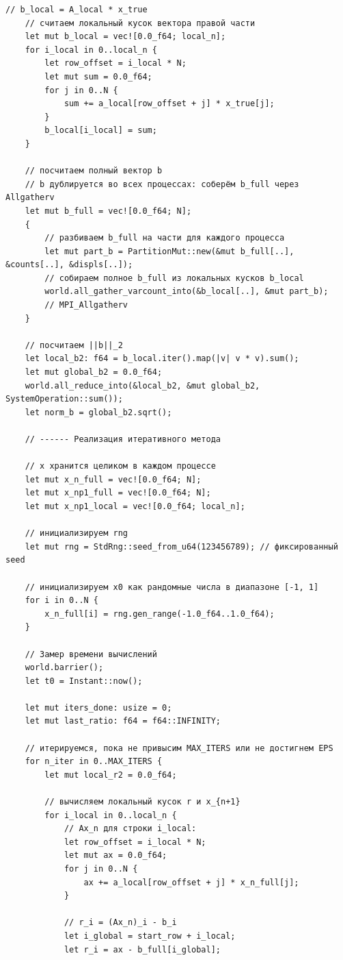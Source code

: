 \documentclass[a4paper, 14pt]{extarticle}
\begin{document}
\begin{lstlisting}[caption={Исходный код программы}, label={lst:source_code}]
    // b_local = A_local * x_true
    // считаем локальный кусок вектора правой части
    let mut b_local = vec![0.0_f64; local_n];
    for i_local in 0..local_n {
        let row_offset = i_local * N;
        let mut sum = 0.0_f64;
        for j in 0..N {
            sum += a_local[row_offset + j] * x_true[j];
        }
        b_local[i_local] = sum;
    }

    // посчитаем полный вектор b
    // b дублируется во всех процессах: соберём b_full через Allgatherv
    let mut b_full = vec![0.0_f64; N];
    {
        // разбиваем b_full на части для каждого процесса
        let mut part_b = PartitionMut::new(&mut b_full[..], &counts[..], &displs[..]);
        // собираем полное b_full из локальных кусков b_local
        world.all_gather_varcount_into(&b_local[..], &mut part_b);
        // MPI_Allgatherv
    }

    // посчитаем ||b||_2
    let local_b2: f64 = b_local.iter().map(|v| v * v).sum();
    let mut global_b2 = 0.0_f64;
    world.all_reduce_into(&local_b2, &mut global_b2, SystemOperation::sum());
    let norm_b = global_b2.sqrt();

    // ------ Реализация итеративного метода

    // x хранится целиком в каждом процессе
    let mut x_n_full = vec![0.0_f64; N];
    let mut x_np1_full = vec![0.0_f64; N];
    let mut x_np1_local = vec![0.0_f64; local_n];

    // инициализируем rng
    let mut rng = StdRng::seed_from_u64(123456789); // фиксированный seed

    // инициализируем x0 как рандомные числа в диапазоне [-1, 1]
    for i in 0..N {
        x_n_full[i] = rng.gen_range(-1.0_f64..1.0_f64);
    }

    // Замер времени вычислений
    world.barrier();
    let t0 = Instant::now();

    let mut iters_done: usize = 0;
    let mut last_ratio: f64 = f64::INFINITY;

    // итерируемся, пока не привысим MAX_ITERS или не достигнем EPS
    for n_iter in 0..MAX_ITERS {
        let mut local_r2 = 0.0_f64;

        // вычисляем локальный кусок r и x_{n+1}
        for i_local in 0..local_n {
            // Ax_n для строки i_local:
            let row_offset = i_local * N;
            let mut ax = 0.0_f64;
            for j in 0..N {
                ax += a_local[row_offset + j] * x_n_full[j];
            }

            // r_i = (Ax_n)_i - b_i
            let i_global = start_row + i_local;
            let r_i = ax - b_full[i_global];


\end{lstlisting}
\end{document}
